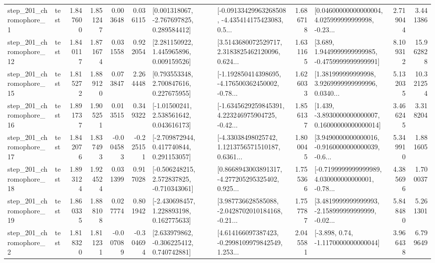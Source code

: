 \begin{tabular}{llrrrrllrlrr}
   step\_201\_chromophore\_1 &      test &      1.847600 &    1.851247 &      0.003648 &  0.036115 &    [0.001318067, -2.767697825, 0.289584412] &  [-0.09133429963268508, -4.435414175423083, 0.5... &       1.686718 &  [0.04600000000000004, 4.025999999999998, -0.23... &            2.719044 &          3.441386 \\
  step\_201\_chromophore\_12 &      test &      1.840117 &    1.871674 &      0.031558 &  0.922054 &     [2.281150922, 1.445965896, 0.009159526] &  [3.5143680072529717, 2.3183825462120096, 0.624... &       1.631165 &   [3.689, 1.9449999999999985, -0.4759999999999991] &            8.109312 &         15.962828 \\
  step\_201\_chromophore\_15 &      test &      1.815272 &    1.889120 &      0.073847 &  2.264448 &     [0.793553348, 2.700847616, 0.227675955] &  [-1.192850414398695, -4.176500362450002, -0.78... &       1.626033 &  [1.381999999999998, 3.9269999999999996, 0.0340... &            5.132035 &         10.321254 \\
  step\_201\_chromophore\_16 &      test &      1.891737 &    1.905251 &      0.013515 &  0.349322 &     [-1.01500241, 2.538561642, 0.043616173] &  [-1.6345629259845391, 4.223246975904725, -0.42... &       1.856137 &  [1.439, -3.8930000000000007, 0.16000000000000014] &            3.466245 &          3.318204 \\
  step\_201\_chromophore\_17 &      test &      1.842076 &    1.837493 &     -0.004583 & -0.225151 &    [-2.709872944, 0.417740844, 0.291153057] &  [-4.33038498025742, 1.1213756571510187, 0.6361... &       1.800045 &  [3.9490000000000016, -0.9160000000000039, -0.6... &            5.349910 &          1.881605 \\
  step\_201\_chromophore\_18 &      test &      1.893124 &    1.924524 &      0.031399 &  0.917028 &   [-0.506248215, 2.572837825, -0.710343061] &  [0.8668943003891317, -4.277205295325402, 0.925... &       1.755366 &  [-0.7199999999999989, 4.030000000000001, -0.78... &            4.385696 &          1.700037 \\
  step\_201\_chromophore\_19 &      test &      1.860335 &    1.888108 &      0.027774 &  0.801942 &    [-2.430698457, 1.228893198, 0.162775633] &  [3.987736628585088, -2.0428702010184168, -0.21... &       1.757787 &  [3.4819999999999993, -2.158999999999999, -0.02... &            5.848480 &          5.261301 \\
   step\_201\_chromophore\_2 &      test &      1.818320 &    1.811231 &     -0.007089 & -0.304694 &    [2.633979862, -0.306225412, 0.740742881] &  [4.614166097387423, -0.2998109979842549, 1.253... &       2.045581 &                [-3.898, 0.74, -1.1170000000000044] &            3.966438 &          6.799649 \\

\end{tabular}
